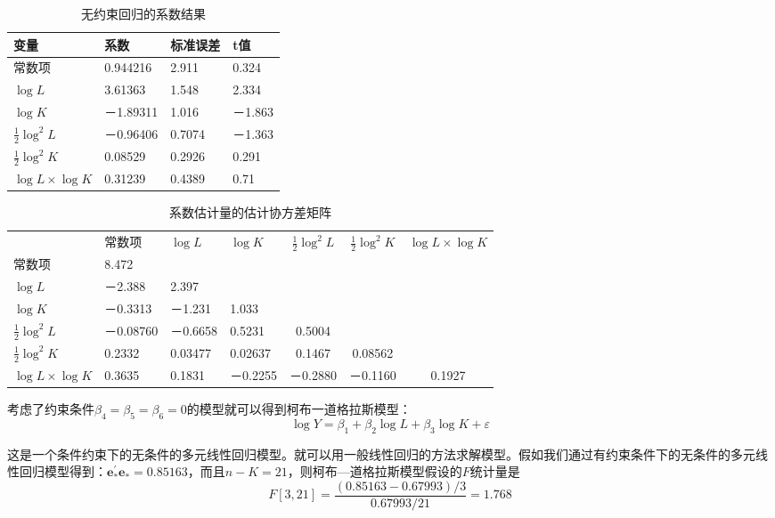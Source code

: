 	\begin{table}[htbp]
		\centering
		\setlength{\tabcolsep}{3em}
		\caption{无约束回归的系数结果}
		\begin{tabular}{llll}
			\hline
			变量   & 系数       & 标准误差   & t值     \\
			\hline
			常数项  & 0.944216 & 2.911  & 0.324  \\
			$ \log L $ & 3.61363  & 1.548  & 2.334  \\
			$ \log K $ & －1.89311 & 1.016  & －1.863 \\
			$ \frac{1}{2}\log^{2}L $ & －0.96406 & 0.7074 & －1.363 \\
			$ \frac{1}{2}\log^{2}K $ & 0.08529  & 0.2926 & 0.291  \\
			$ \log L \times \log K $ & 0.31239  & 0.4389 & 0.71  \\
			\hline
		\end{tabular}
	\end{table}
	\begin{table}[htbp]
		\centering
		\caption{系数估计量的估计协方差矩阵}
		\begin{tabular}{llllccc}
			\hline
			& 常数项  & $ \log L $  & $ \log K $  & $ \frac{1}{2}\log^{2}L $  & $ \frac{1}{2}\log^{2}K $  & $ \log L \times \log K $        \\
			常数项      & 8.472    &         &         &         &         &        \\
			$ \log L $ & －2.388   & 2.397   &         &         &         &        \\
			$ \log K $ & －0.3313  & －1.231  & 1.033   &         &         &        \\
			$ \frac{1}{2}\log^{2}L $ & －0.08760 & －0.6658 & 0.5231  & 0.5004  &         &        \\
			$ \frac{1}{2}\log^{2}K $ & 0.2332   & 0.03477 & 0.02637 & 0.1467  & 0.08562 &        \\
			$ \log L \times \log K $ & 0.3635   & 0.1831  & －0.2255 & －0.2880 & －0.1160 & 0.1927    \\
			\hline
		\end{tabular}
	\end{table}

	考虑了约束条件$ \beta_{4}=\beta_{5}=\beta_{6}=0 $的模型就可以得到柯布一道格拉斯模型：
	$$ \log Y=\beta_{1}+\beta_{2} \log L+\beta_{3} \log K+\varepsilon $$
	
	这是一个条件约束下的无条件的多元线性回归模型。就可以用一般线性回归的方法求解模型。假如我们通过有约束条件下的无条件的多元线性回归模型得到：$ \boldsymbol{e}_{*}^{\prime} \boldsymbol{e}_{*}=0.85163 $，而且$ n-K=21  $，则柯布—道格拉斯模型假设的$ F $统计量是
	$$ F\left [ 3,21 \right ] =\frac{(0.85163-0.67993) / 3}{0.67993 / 21}=1.768 $$

